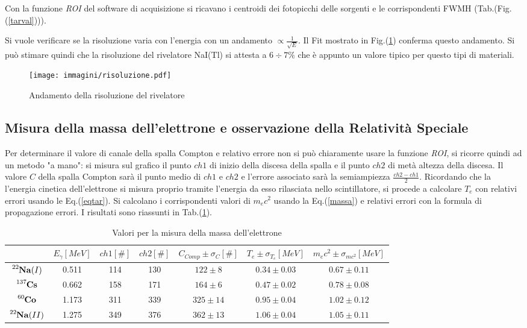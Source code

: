 \documentclass[12pt,a4paper,openright,twoside]{article}
\numberwithin{equation}{section} %
\begin{document}
Con la funzione \textit{ROI} del software di acquisizione si ricavano i centroidi dei fotopicchi delle sorgenti e le corrispondenti FWMH (Tab.(Fig.(\ref{tarval}))).

 Si vuole verificare se la risoluzione varia con l'energia con un andamento $\propto \frac{1}{\sqrt{E}} $. Il Fit mostrato in Fig.(\ref{risfig}) conferma questo andamento. Si può stimare quindi che la risoluzione del rivelatore NaI(Tl) si attesta a $6 \div 7 \% $ che è appunto un valore tipico per questo tipi di materiali.

\begin{figure}[hbtp]
\centering
\texttt{[image: immagini/risoluzione.pdf]}
\caption{Andamento della risoluzione del rivelatore}
\label{risfig}
\end{figure}

\pagebreak

\subsection{Misura della massa dell'elettrone e osservazione della Relatività Speciale} \label{rel}

Per determinare il valore di canale della spalla Compton e relativo errore non si può chiaramente usare la funzione \textit{ROI}, si ricorre quindi ad un metodo "a mano": si misura sul grafico il punto $ch1$ di inizio della discesa della spalla e il punto $ch2$ di metà altezza della discesa.
Il valore $C$ della  spalla Compton sarà il punto medio di $ch1$ e $ch2$ e l'errore associato sarà la semiampiezza $\frac{ch2-ch1}{2}$.
Ricordando che la l'energia cinetica dell'elettrone si misura proprio tramite l'energia da esso rilasciata nello scintillatore, si procede a calcolare $T_e$ con relativi errori usando le Eq.(\ref{eqtar}).
Si calcolano i corrispondenti valori di $m_e c^2$ usando la Eq.(\ref{massa}) e relativi errori con la formula di propagazione errori. 
I risultati sono riassunti in Tab.(\ref{masstab}).

\begin{table}[]
\centering
\renewcommand\arraystretch{1.2}
\begin{tabular}{|c|c|c|c|c|c|c|}
\hline
 & $E_{\gamma} [MeV]$ & $ch1 [\#]$ & $ch2 [\#]$ & $C_{Comp} \pm \sigma_C [\#]$ & $T_e \pm \sigma_{T_e} [MeV]$ & $m_e c^2 \pm \sigma_{mc^2} [MeV]$   \\ \hline
 $\ce{^{22}_{} \mathbf{Na}} (I)$& 0.511 &114  &130  & $122 \pm 8 $ & $ 0.34\pm 0.03$ &   $0.67 \pm 0.11$   \\ \hline
 $\ce{^{137}_{} \mathbf{Cs}}$ & 0.662 & 158 & 171 & $164 \pm 6$  & $ 0.47\pm 0.02$ &  $0.78 \pm 0.08 $    \\ \hline
  $\ce{^{60}_{} \mathbf{Co}}$& 1.173 & 311 & 339 & $325 \pm 14 $ & $ 0.95\pm 0.04$ &  $1.02 \pm 0.12 $    \\ \hline
  $\ce{^{22}_{} \mathbf{Na}} (II)$& 1.275 & 349 & 376 & $362 \pm 13 $ & $ 1.06\pm 0.04 $ &   $ 1.05 \pm 0.11$   \\ \hline
\end{tabular}
\caption{Valori per la misura della massa dell'elettrone}
\label{masstab}
\end{table}
\end{document}
